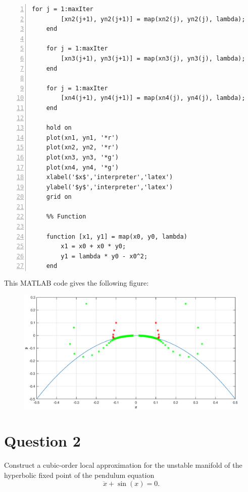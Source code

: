 \documentclass[twoside,10pt,a4paper]{article}
\begin{document}
\begin{enumerate}[label=(\alph*)]
\begin{Verbatim}[numbers = left]
	for j = 1:maxIter
	    [xn2(j+1), yn2(j+1)] = map(xn2(j), yn2(j), lambda);
	end
	
	for j = 1:maxIter
	    [xn3(j+1), yn3(j+1)] = map(xn3(j), yn3(j), lambda);
	end
	
	for j = 1:maxIter
	    [xn4(j+1), yn4(j+1)] = map(xn4(j), yn4(j), lambda);
	end
	
	hold on
	plot(xn1, yn1, '*r')
	plot(xn2, yn2, '*r')
	plot(xn3, yn3, '*g')
	plot(xn4, yn4, '*g')
	xlabel('$x$','interpreter','latex')
	ylabel('$y$','interpreter','latex')
	grid on
		
	%% Function
	
	function [x1, y1] = map(x0, y0, lambda)
	    x1 = x0 + x0 * y0;
	    y1 = lambda * y0 - x0^2;
	end
\end{Verbatim}

\newpage

This MATLAB code gives the following figure:
\begin{figure}[H]
	\centering
	\includegraphics[scale=0.5]{Graphics/S01D02.eps}
\end{figure}

\end{enumerate}

\newpage

\section*{Question 2}
Construct a cubic-order local approximation for the unstable manifold of the hyperbolic fixed point of the pendulum equation
\begin{equation*}
	\ddot{x} + \sin(x) = 0.
\end{equation*}
\end{document}
